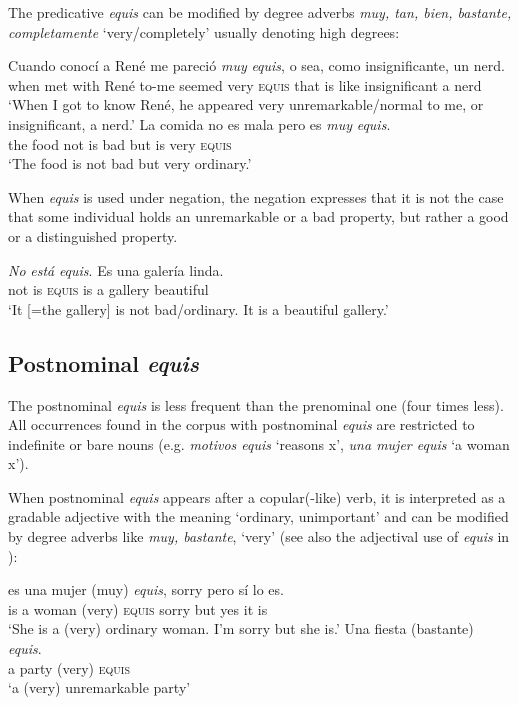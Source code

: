 \documentclass[output=paper]{langsci/langscibook}
\begin{document}
The predicative \textit{equis} can be modified by degree adverbs \textit{muy, tan, bien, bastante, completamente} ‘very/completely’ usually denoting high degrees:

\ea\label{ex:kellert:19}
\gll Cuando conocí a René me pareció \textit{muy} \textit{equis}, o sea, como insignificante, un nerd.\\
when met with René to-me seemed very \textsc{equis} that is like insignificant a nerd\\
\glt ‘When I got to know René, he appeared very unremarkable/normal to me, or insignificant, a nerd.’
\ex 
\gll La comida no es mala pero es \textit{muy} \textit{equis}.\\
the food not is bad but is very \textsc{equis}\\
\glt ‘The food is not bad but very ordinary.’
\z

When \textit{equis} is used under negation, the negation expresses that it is not the case that some individual holds an unremarkable or a bad property, but rather a good or a distinguished property.

\ea\label{ex:kellert:21}
\gll \textit{No} \textit{está} \textit{equis}. Es una galería linda.\\
not is \textsc{equis} is a gallery beautiful\\
\glt ‘It [=the gallery] is not bad/ordinary. It is a beautiful gallery.’
\z

\subsection{Postnominal \textit{equis}}\label{sec:kellert:2.3}
The postnominal \textit{equis} is less frequent than the prenominal one (four times less). All occurrences found in the corpus with postnominal \textit{equis} are restricted to indefinite or bare nouns (e.g.  \textit{motivos equis} ‘reasons x’, \textit{una mujer equis} ‘a woman x’).

When postnominal \textit{equis} appears after a copular(-like) verb, it is interpreted as a gradable adjective with the meaning ‘ordinary, unimportant’ and can be modified by degree adverbs like \textit{muy, bastante}, ‘very’ (see also the adjectival use of \textit{equis} in ):

\ea\label{ex:kellert:22}
\gll  es una mujer (muy) \textit{equis}, sorry pero sí lo es.\\
is a woman (very) \textsc{equis} sorry but yes it is\\
\glt ‘She is a (very) ordinary woman. I’m sorry but she is.’
\ex 
\gll  Una fiesta (bastante) \textit{equis}.\\
a party (very) \textsc{equis}\\
\glt ‘a (very) unremarkable party’
\z
\end{document}
